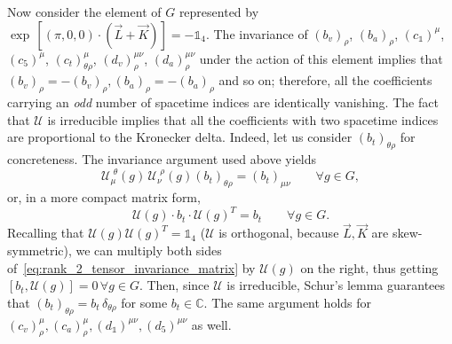 \documentclass[a4paper, 11pt]{article}
\newcommand{\id}{\mathds{1}}								%
\theoremstyle{thm}
\begin{document}
Now consider the element of $G$ represented by $\exp\,\![(\pi, 0, 0) \cdot (\vec{L} + \vec{K})] = - \id_4$. The invariance of $(b_v)_\rho$, $(b_a)_\rho$, $(c_\id)^\mu$, $(c_5)^\mu$, $(c_t)_{\theta \rho}^\mu$, $(d_v)_\rho^{\mu \nu}$, $(d_a)_\rho^{\mu \nu}$ under the action of this element implies that $(b_v)_\rho = - (b_v)_\rho, (b_a)_\rho = - (b_a)_\rho$ and so on; therefore, all the coefficients carrying an \emph{odd} number of spacetime indices are identically vanishing.  The fact that $\mathcal{U}$ is irreducible implies that all the coefficients with two spacetime indices are proportional to the Kronecker delta. Indeed, let us consider $(b_t)_{\theta \rho}$ for concreteness. The invariance argument used above yields
\begin{equation}
\label{eq:rank_2_tensor_invariance}
\mathcal{U}_\mu^{\,\, \theta}(g) \, \mathcal{U}_\nu^{\,\, \rho}(g) (b_t)_{\theta \rho} = (b_t)_{\mu \nu} \qquad \forall g \in G,
\end{equation}
or, in a more compact matrix form,
\begin{equation}
\label{eq:rank_2_tensor_invariance_matrix}
\mathcal{U}(g) \cdot b_t \cdot \mathcal{U}(g)^T = b_t \qquad \forall g \in G.
\end{equation}
Recalling that $\mathcal{U}(g) \mathcal{U}(g)^T = \id_4$ ($\mathcal{U}$ is orthogonal, because $\vec{L}, \vec{K}$ are skew-symmetric), we can multiply both sides of~\eqref{eq:rank_2_tensor_invariance_matrix} by $\mathcal{U}(g)$ on the right, thus getting $[b_t, \mathcal{U}(g)] = 0 \, \forall g \in G$. Then, since $\mathcal{U}$ is irreducible, Schur's lemma guarantees that $(b_t)_{\theta \rho} = b_t \, \delta_{\theta \rho}$ for some $b_t \in \mathbb{C}$. The same argument holds for $(c_v)_\rho^\mu, (c_a)_\rho^\mu, (d_\id)^{\mu \nu}, (d_5)^{\mu \nu}$ as well. 
\end{document}

